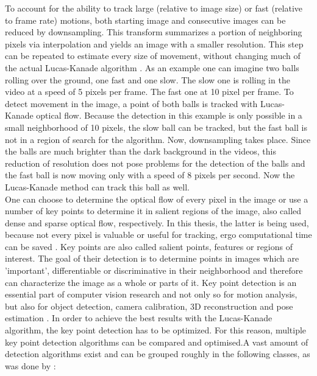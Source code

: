 \documentclass[Bachelorarbeit.tex]{subfiles}
\begin{document}
To account for the ability to track large (relative to image size) or fast (relative to frame rate) motions, both starting image and consecutive images can be reduced by downsampling. This transform summarizes a portion of neighboring pixels via interpolation and yields an image with a smaller resolution. This step can be repeated to estimate every size of movement, without changing much of the actual Lucas-Kanade algorithm \cite{bouguet2001pyramidal}. As an example one can imagine two balls rolling over the ground, one fast and one slow. The slow one is rolling in the video at a speed of 5 pixels per frame. The fast one at 10 pixel per frame. To detect movement in the image, a point of both balls is tracked with Lucas-Kanade optical flow. Because the detection in this example is only possible in a small neighborhood of 10 pixels, the slow ball can be tracked, but the fast ball is not in a region of search for the algorithm. Now, downsampling takes place. Since the balls are much brighter than the dark background in the videos, this reduction of resolution does not pose problems for the detection of the balls and the fast ball is now moving only with a speed of 8 pixels per second. Now the Lucas-Kanade method can track this ball as well.\\
One can choose to determine the optical flow of every pixel in the image or use a number of key points to determine it in salient regions of the image, also called dense and sparse optical flow, respectively. In this thesis, the latter is being used, because not every pixel is valuable or useful for tracking, ergo computational time can be saved \citep{shi1993good}. Key points are also called salient points, features or regions of interest. The goal of their detection is to determine points in images which are 'important', differentiable or discriminative in their neighborhood and therefore can characterize the image as a whole or parts of it. Key point detection is an essential part of computer vision research and not only so for motion analysis, but also for object detection, camera calibration, 3D reconstruction and pose estimation \citep[p. 179]{tuytelaars2008local}. In order to achieve the best results with the Lucas-Kanade algorithm, the key point detection has to be optimized. For this reason, multiple key point detection algorithms can be compared and optimised.A vast amount of detection algorithms exist and can be grouped roughly in the following classes, as was done by \cite[pp. 337]{gauglitz2011evaluation}:\\ 
\end{document}
